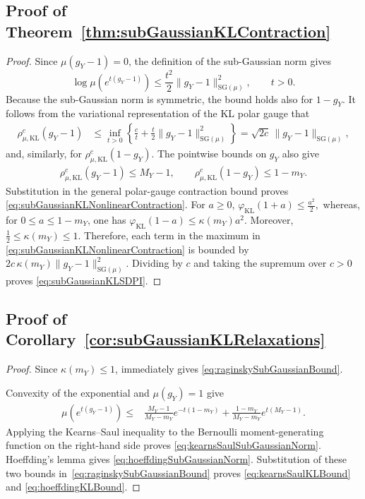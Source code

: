 \documentclass[11pt]{article}
\theoremstyle{plain}
\theoremstyle{remark}
\begin{document}
\subsection{Proof of Theorem~\ref{thm:subGaussianKLContraction}}\label{app:proofSubGaussianKLContraction}
\begin{proof}
Since $\mu(g_Y-1)=0$, the definition of the sub-Gaussian norm gives
\[
\log\mu\left(e^{t(g_Y-1)}\right)
\leq
\frac{t^2}{2}
\lVert g_Y-1\rVert_{\mathrm{SG}(\mu)}^2,
\qquad t>0.
\]
Because the sub-Gaussian norm is symmetric, the bound holds also for $1-g_Y$.
It follows from the variational representation of the KL polar
gauge that
\begin{align}
\rho_{\mu,\mathrm{KL}}^c(g_Y-1)
&\leq
\inf_{t>0}
\left\{
\frac{c}{t}
+
\frac{t}{2}
\lVert g_Y-1\rVert_{\mathrm{SG}(\mu)}^2
\right\} =
\sqrt{2c}\,
\lVert g_Y-1\rVert_{\mathrm{SG}(\mu)},
\label{eq:subGaussianPositiveGauge}
\end{align}
and, similarly, for $\rho_{\mu,\mathrm{KL}}^c(1-g_Y).$
The pointwise bounds on $g_Y$ also give
\begin{align}
\rho_{\mu,\mathrm{KL}}^c(g_Y-1)
\leq M_Y-1, \qquad
\rho_{\mu,\mathrm{KL}}^c(1-g_Y)
\leq 1-m_Y.
\end{align}
Substitution in the general polar-gauge contraction bound proves
\eqref{eq:subGaussianKLNonlinearContraction}. For $a\geq0$, $\varphi_{\mathrm{KL}}(1+a)
\leq
\frac{a^2}{2},$
whereas, for $0\leq a\leq1-m_Y$, one has $
\varphi_{\mathrm{KL}}(1-a)
\leq
\kappa(m_Y)a^2.
\label{eq:klNegativeQuadraticBound}$
Moreover,
\(
\frac12\leq\kappa(m_Y)\leq1.
\)
Therefore, each term in the maximum in
\eqref{eq:subGaussianKLNonlinearContraction} is bounded by
\(
2c\,\kappa(m_Y)
\lVert g_Y-1\rVert_{\mathrm{SG}(\mu)}^2.
\)
Dividing by $c$ and taking the supremum over $c>0$ proves
\eqref{eq:subGaussianKLSDPI}.
\end{proof}

\subsection{Proof of Corollary~\ref{cor:subGaussianKLRelaxations}}\label{app:proofSubGaussianKLRelaxations}
\begin{proof}
Since $\kappa(m_Y)\leq1$,
 immediately gives
\eqref{eq:raginskySubGaussianBound}.

Convexity of the exponential and $\mu(g_Y)=1$ give
\begin{align}
\mu\left(e^{t(g_Y-1)}\right)
\leq&
\frac{M_Y-1}{M_Y-m_Y}
e^{-t(1-m_Y)}+
\frac{1-m_Y}{M_Y-m_Y}
e^{t(M_Y-1)}.
\end{align}
Applying the Kearns--Saul inequality to the Bernoulli
moment-generating function on the right-hand side proves
\eqref{eq:kearnsSaulSubGaussianNorm}. Hoeffding's lemma gives
\eqref{eq:hoeffdingSubGaussianNorm}. Substitution of these two
bounds in~\eqref{eq:raginskySubGaussianBound} proves
\eqref{eq:kearnsSaulKLBound} and
\eqref{eq:hoeffdingKLBound}.
\end{proof}
\end{document}
